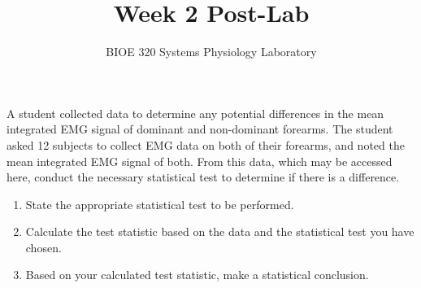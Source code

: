 \documentclass{article}
\title{Week 2 Post-Lab}
\author{BIOE 320 Systems Physiology Laboratory}
\date{}
\begin{document}
\maketitle
\large

A student collected data to determine any potential differences in the mean integrated EMG signal of dominant and non-dominant forearms. The student asked 12 subjects to collect EMG data on both of their forearms, and noted the mean integrated EMG signal of both.
 From this data, which may be accessed here, conduct the necessary statistical test to determine if there is a difference.

\begin{enumerate}
	\item State the appropriate statistical test to be performed.
	\item Calculate the test statistic based on the data and the statistical test you have chosen.
	\item Based on your calculated test statistic, make a statistical conclusion.
\end{enumerate}
\end{document}

